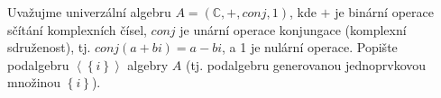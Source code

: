 Uvažujme univerzální algebru $A = (\mathbb{C}, +, conj,1)$, kde $+$ je binární
operace sčítání komplexních čísel, $conj$ je unární
operace konjungace (komplexní sdruženost), tj. $conj(a + bi) = a - bi$, a 1 je
nulární operace. Popište podalgebru $\left \langle \left \{ i \right \} \right
\rangle$ algebry $A$ (tj. podalgebru generovanou jednoprvkovou množinou $\left \{ i \right \} $).
